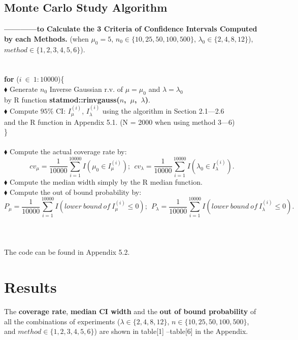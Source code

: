 \documentclass[12pt]{article}
\begin{document}
\subsection{Monte Carlo Study Algorithm }
\textbf{------------to Calculate the 3 Criteria of Confidence Intervals Computed by each Methods.} (when $\mu_0 =5$, $n_0 \in \{10,25,50,100,500\}$, $\lambda_0 \in \{2,4,8,12\}$),$method \in \{1,2,3,4,5,6\}$).\\
 \\
 \\
 \textbf{for} ($i \ \in \ 1:10000$)\{\\
  $\blacklozenge$ Generate $n_0$ Inverse Gaussian r.v. of $\mu=\mu_0$ and $\lambda=\lambda_0$ \\
  by R function \textbf{statmod::rinvgauss($n$,\ $\mu$,\ $\lambda$)}.\\
$\blacklozenge$ Compute $95\%$ CI: $I_{\mu}^{(i)}$, $I_{\lambda}^{(i)}$  using the algorithm in Section 2.1---2.6\\
 and the R function in Appendix 5.1. (N = 2000 when using method 3---6)\\
\}\\
\\
$\blacklozenge$ Compute the actual coverage rate by:
 $$cv_{\mu}=\frac{1}{10000}\sum_{i=1}^{10000}I(\mu_0 \in I_{\mu}^{(i)}); \ \ cv_{\lambda}=\frac{1}{10000}\sum_{i=1}^{10000}I(\lambda_0 \in I_{\lambda}^{(i)}).$$
$\blacklozenge$ Compute the median width simply by the R median function.\\
$\blacklozenge$ Compute the out of bound probability by:
 $$P_{\mu}=\frac{1}{10000}\sum_{i=1}^{10000}I(lower\ bound\ of\ I_{\mu}^{(i)} \leq 0); \ \ P_{\lambda}=\frac{1}{10000}\sum_{i=1}^{10000}I(lower\ bound\ of\ I_{\lambda}^{(i)} \leq 0).$$
\\
\\
\\
The code can be found in Appendix 5.2.\\


\section{Results}

The \textbf{coverage rate}, \textbf{median CI width} and the \textbf{out of bound probability} of all the combinations of experiments ($\lambda \in \{2,4,8,12\}$, $n \in \{10,25,50,100,500\}$, and $method \in \{1,2,3,4,5,6\}$) are shown in table[1] --table[6] in the Appendix.
\end{document}
